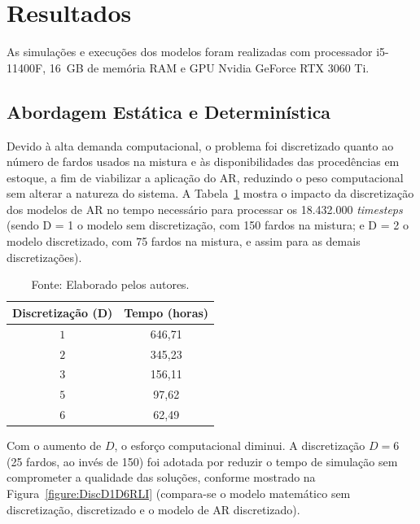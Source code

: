 \documentclass[a4paper,12pt]{article}
\begin{document}
\section{Resultados}

As simulações e execuções dos modelos foram realizadas com processador i5-11400F, 16~GB de memória RAM e GPU Nvidia GeForce RTX 3060 Ti.

\subsection{Abordagem Estática e Determinística}

Devido à alta demanda computacional, o problema foi discretizado quanto ao número de fardos usados na mistura e às disponibilidades das procedências em estoque, a fim de viabilizar a aplicação do AR, reduzindo o peso computacional sem alterar a natureza do sistema. A Tabela~\ref{tab:discretizacao} mostra o impacto da discretização dos modelos de AR no tempo necessário para processar os 18.432.000 \textit{timesteps} (sendo D = 1 o modelo sem discretização, com 150 fardos na mistura; e D = 2 o modelo discretizado, com 75 fardos na mistura, e assim para as demais discretizações).

\begin{table}[htp]
    \centering
    \caption{Impacto da discretização no tempo computacional.}
    \begin{tabular}{c c}
    \toprule
    Discretização (D) & Tempo (horas) \\
    \midrule
    \(1\) & 646,71 \\
    \(2\) & 345,23 \\
    \(3\) & 156,11 \\
    \(5\) & 97,62  \\
    \(6\) & 62,49  \\
    \bottomrule
    \end{tabular}
    \label{tab:discretizacao}
    \caption*{\small Fonte: Elaborado pelos autores.}
\end{table}

Com o aumento de \(D\), o esforço computacional diminui. A discretização \(D=6\) (25 fardos, ao invés de 150) foi adotada por reduzir o tempo de simulação sem comprometer a qualidade das soluções, conforme mostrado na Figura~\ref{figure:DiscD1D6RLI} (compara-se o modelo matemático sem discretização, discretizado e o modelo de AR discretizado).
\end{document}
